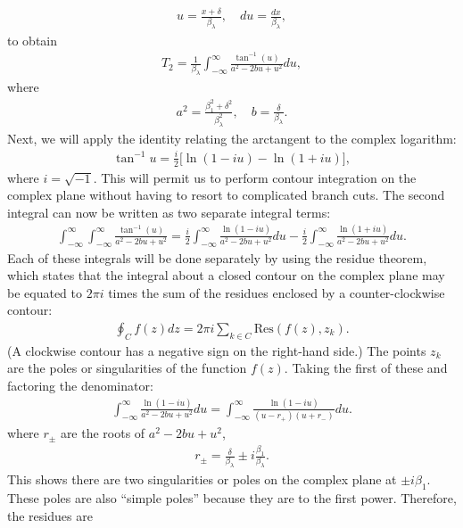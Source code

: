 \begin{align}
  u = \frac{x + \delta}{\beta_\lambda}, \quad du = \frac{dx}{\beta_\lambda} , \nonumber
\end{align}
to obtain
\begin{align}
  T_2 = \frac{1}{\beta_\lambda} \int_{-\infty}^\infty \frac{ \tan^{-1}(u)}{a^2 - 2bu + u^2} du ,
\end{align}
where
\begin{align}
  a^2 = \frac{ \beta_1^2 + \delta^2 }{ \beta_\lambda^2 }, \quad b = \frac{\delta}{\beta_\lambda} . \nonumber
\end{align}
Next, we will apply the identity relating the arctangent to the complex logarithm:
\begin{align}
  \tan^{-1} u = \frac{i}{2} \bigg[ \ln( 1 - i u ) - \ln( 1 + i u ) \bigg],
\end{align}
where $i = \sqrt{-1}$. This will permit us to perform contour integration on the complex plane without having to resort to complicated branch cuts. The second integral can now be written as two separate integral terms:
\begin{align}
  \int_{-\infty}^\infty \int_{-\infty}^\infty \frac{ \tan^{-1}(u)}{a^2 - 2bu + u^2} 
  = \frac{i}{2} \int_{-\infty}^\infty \frac{\ln( 1 - iu)}{a^2 - 2bu + u^2} du 
   - \frac{i}{2} \int_{-\infty}^\infty \frac{\ln( 1 + iu)}{a^2 - 2bu + u^2} du .
\end{align}
Each of these integrals will be done separately by using the residue theorem, which states that the integral about a closed contour on the complex plane may be equated to $2\pi i$ times the sum of the residues enclosed by a counter-clockwise contour:
\begin{align}
  \oint_C f(z) dz = 2\pi i \sum_{k \in C} \textrm{Res}( f(z), z_k ) .
\end{align}
(A clockwise contour has a negative sign on the right-hand side.) The points $z_k$ are the poles or singularities of the function $f(z)$. Taking the first of these and factoring the denominator:
\begin{align}
    \int_{-\infty}^\infty \frac{\ln( 1 - iu)}{a^2 - 2bu + u^2} du 
  = \int_{-\infty}^\infty \frac{\ln( 1 - iu)}{(u - r_+)(u + r_-)} du .
\end{align}
where $r_{\pm}$ are the roots of $a^2 - 2bu + u^2$,
\begin{align}
  r_\pm = \frac{\delta}{\beta_\lambda} \pm i \frac{\beta_1}{\beta_\lambda} .
\end{align}
This shows there are two singularities or poles on the complex plane at $\pm i\beta_1$. These poles are also ``simple poles'' because they are to the first power. Therefore, the residues are
